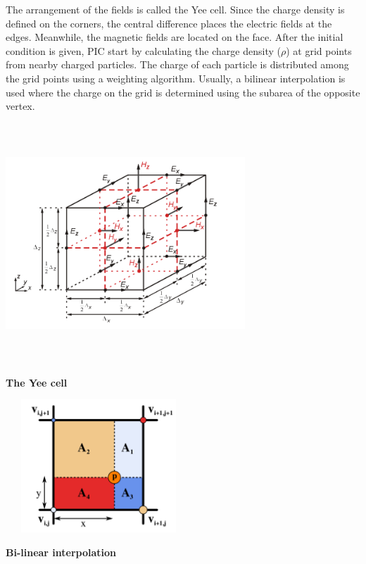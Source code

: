 \documentclass[]{article}
\begin{document}
The arrangement of the fields is called the Yee cell.
Since the charge density is defined on the corners, the central difference places the electric fields at the edges. Meanwhile, the magnetic fields are located on the face. After the initial condition is given, PIC start by calculating the charge density ($\rho$) at grid points from nearby charged
particles. The charge of each particle is distributed among the grid points using a weighting algorithm. Usually, a bilinear interpolation is used where the charge on the grid is determined using the subarea of the opposite vertex.
\begin{minipage}{0.6\textwidth}\raggedright
    \includegraphics[height=9cm, width=9cm]{yee.png}
    \begin{center}
        \textbf{The Yee cell}
    \end{center}
\end{minipage}
\begin{minipage}{0.35\textwidth}\raggedright
    \includegraphics[height=5cm, width=7cm]{charge.png}
    \begin{center}
        \textbf{Bi-linear interpolation}
    \end{center}
\end{minipage}
\end{document}
